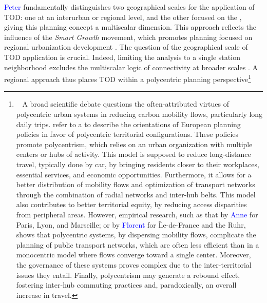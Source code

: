 \begin{refsegment}
\textcolor{blue}{Peter} \textcolor{blue}{\textcite[62, 67, 104]{calthorpe_next_1993}} fundamentally distinguishes two geographical scales for the application of \acrshort{TOD}: one at an interurban or regional level, and the other focused on the , giving this planning concept a multiscalar dimension. This approach reflects the influence of the \textsl{Smart Growth} movement, which promotes planning focused on regional urbanization development \textcolor{blue}{\autocite[70]{dushina_tod_2015}}. The question of the geographical scale of \acrshort{TOD} application is crucial. Indeed, limiting the analysis to a single station neighborhood excludes the multiscalar logic of connectivity at broader scales \textcolor{blue}{\autocite[273]{menerault_gares_2001}}. A regional approach thus places \acrshort{TOD} within a polycentric planning perspective\footnote{~
    A broad scientific debate questions the often-attributed virtues of polycentric urban systems in reducing carbon mobility flows, particularly long daily trips. \textcolor{blue}{\textcite[515]{richardson_discourses_2000}} refer to a  to describe the orientations of European planning policies in favor of polycentric territorial configurations. These policies promote polycentrism, which relies on an urban organization with multiple centers or hubs of activity. This model is supposed to reduce long-distance travel, typically done by car, by bringing residents closer to their workplaces, essential services, and economic opportunities. Furthermore, it allows for a better distribution of mobility flows and optimization of transport networks through the combination of radial networks and inter-hub belts. This model also contributes to better territorial equity, by reducing access disparities from peripheral areas. However, empirical research, such as that by \textcolor{blue}{Anne} \textcolor{blue}{\textcite[1545]{aguilera_growth_2005}} for Paris, Lyon, and Marseille; or by \textcolor{blue}{Florent} \textcolor{blue}{\textcite{le_nechet_modelling_2019}} for Île-de-France and the Ruhr, shows that polycentric systems, by dispersing mobility flows, complicate the planning of public transport networks, which are often less efficient than in a monocentric model where flows converge toward a single center. Moreover, the governance of these systems proves complex due to the inter-territorial issues they entail. Finally, polycentrism may generate a rebound effect, fostering inter-hub commuting practices and, paradoxically, an overall increase in travel.
}
\end{refsegment}
